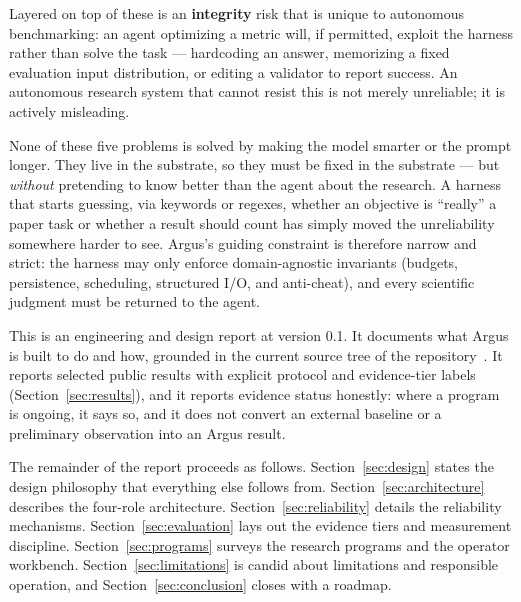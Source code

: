 Layered on top of these is an \textbf{integrity} risk that is unique to
autonomous benchmarking: an agent optimizing a metric will, if permitted, exploit
the harness rather than solve the task --- hardcoding an answer, memorizing a
fixed evaluation input distribution, or editing a validator to report success.
An autonomous research system that cannot resist this is not merely unreliable;
it is actively misleading.

None of these five problems is solved by making the model smarter or the prompt
longer. They live in the substrate, so they must be fixed in the substrate --- but
\emph{without} pretending to know better than the agent about the research. A
harness that starts guessing, via keywords or regexes, whether an objective is
``really'' a paper task or whether a result should count has simply moved the
unreliability somewhere harder to see. Argus's guiding constraint is therefore
narrow and strict: the harness may only enforce domain-agnostic invariants
(budgets, persistence, scheduling, structured I/O, and anti-cheat), and every
scientific judgment must be returned to the agent.

\begin{callout}
This is an engineering and design report at version 0.1. It documents what Argus
is built to do and how, grounded in the current source tree of the
 repository~\cite{argus_repo}. It reports selected public
results with explicit protocol and evidence-tier labels
(Section~\ref{sec:results}), and it reports evidence status honestly: where a
program is ongoing, it says so, and it does not convert an external baseline or a
preliminary observation into an Argus result.
\end{callout}

The remainder of the report proceeds as follows.
Section~\ref{sec:design} states the design philosophy that everything else
follows from. Section~\ref{sec:architecture} describes the four-role
architecture. Section~\ref{sec:reliability} details the reliability mechanisms.
Section~\ref{sec:evaluation} lays out the evidence tiers and measurement
discipline. Section~\ref{sec:programs} surveys the research programs and the
operator workbench. Section~\ref{sec:limitations} is candid about limitations and
responsible operation, and Section~\ref{sec:conclusion} closes with a roadmap.
